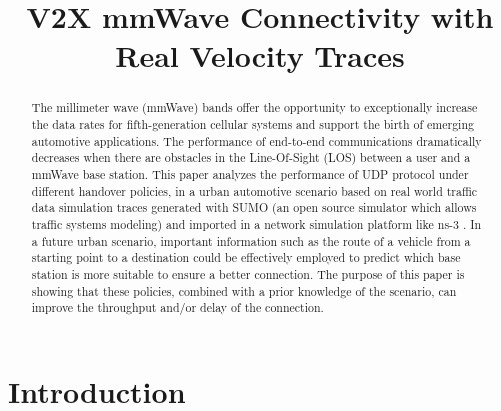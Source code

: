 \documentclass[conference,10pt]{IEEEtran}
\begin{document}
\title{V2X mmWave Connectivity with Real Velocity Traces}

\author{
}

\maketitle

\begin{abstract}
The millimeter wave (mmWave) bands offer the opportunity to exceptionally increase the data rates for fifth-generation cellular systems and support the birth of emerging automotive applications. The performance of end-to-end communications dramatically decreases when there are obstacles in the Line-Of-Sight (LOS) between a user and a mmWave base station.
This paper analyzes the performance of UDP protocol under different handover policies, in a urban automotive scenario based on real world traffic data simulation traces generated with SUMO (an open source simulator which allows traffic systems modeling) \cite{sumo} and imported in a network simulation platform like ns-3 \cite{ns3}. In a future urban scenario, important information such as the route of a vehicle from a starting point to a destination could be effectively employed to predict which base station is more suitable to ensure a better connection. The purpose of this paper is showing that these policies, combined with a prior knowledge of the scenario, can improve the throughput and/or delay of the connection.
\end{abstract}

\section{Introduction}\label{sec:intro}
\end{document}
